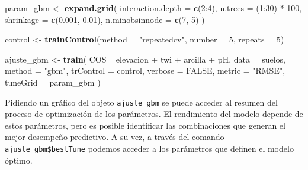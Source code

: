 \documentclass[11pt,b5paper,]{krantz}
\newenvironment{Shaded}{}{}
\newcommand{\CommentTok}[1]{\textcolor[rgb]{0.38,0.63,0.69}{\textit{#1}}}
\newcommand{\DataTypeTok}[1]{\textcolor[rgb]{0.56,0.13,0.00}{#1}}
\newcommand{\DecValTok}[1]{\textcolor[rgb]{0.25,0.63,0.44}{#1}}
\newcommand{\FloatTok}[1]{\textcolor[rgb]{0.25,0.63,0.44}{#1}}
\newcommand{\KeywordTok}[1]{\textcolor[rgb]{0.00,0.44,0.13}{\textbf{#1}}}
\newcommand{\NormalTok}[1]{#1}
\newcommand{\OperatorTok}[1]{\textcolor[rgb]{0.40,0.40,0.40}{#1}}
\newcommand{\OtherTok}[1]{\textcolor[rgb]{0.00,0.44,0.13}{#1}}
\newcommand{\StringTok}[1]{\textcolor[rgb]{0.25,0.44,0.63}{#1}}
\begin{document}
\begin{Shaded}
\begin{Highlighting}[]
\NormalTok{param_gbm <-}\StringTok{  }\KeywordTok{expand.grid}\NormalTok{(}
  \DataTypeTok{interaction.depth =} \KeywordTok{c}\NormalTok{(}\DecValTok{2}\OperatorTok{:}\DecValTok{4}\NormalTok{),}
  \DataTypeTok{n.trees =}\NormalTok{ (}\DecValTok{1}\OperatorTok{:}\DecValTok{30}\NormalTok{) }\OperatorTok{*}\StringTok{ }\DecValTok{100}\NormalTok{,}
  \DataTypeTok{shrinkage =} \KeywordTok{c}\NormalTok{(}\FloatTok{0.001}\NormalTok{, }\FloatTok{0.01}\NormalTok{),}
  \DataTypeTok{n.minobsinnode =} \KeywordTok{c}\NormalTok{(}\DecValTok{7}\NormalTok{, }\DecValTok{5}\NormalTok{)}
\NormalTok{)}

\NormalTok{control <-}\StringTok{ }\KeywordTok{trainControl}\NormalTok{(}\DataTypeTok{method =} \StringTok{"repeatedcv"}\NormalTok{,}
                        \DataTypeTok{number =} \DecValTok{5}\NormalTok{,}
                        \DataTypeTok{repeats =} \DecValTok{5}\NormalTok{)}

\NormalTok{ajuste_gbm <-}\StringTok{ }\KeywordTok{train}\NormalTok{(}
\NormalTok{  COS }\OperatorTok{~}\StringTok{ }\NormalTok{elevacion }\OperatorTok{+}\StringTok{ }\NormalTok{twi }\OperatorTok{+}\StringTok{ }\NormalTok{arcilla }\OperatorTok{+}\StringTok{ }\NormalTok{pH,}
  \DataTypeTok{data =}\NormalTok{ suelos,}
  \DataTypeTok{method =} \StringTok{"gbm"}\NormalTok{,}
  \DataTypeTok{trControl =}\NormalTok{ control,}
  \DataTypeTok{verbose =} \OtherTok{FALSE}\NormalTok{,}
  \DataTypeTok{metric =} \StringTok{"RMSE"}\NormalTok{,}
  \DataTypeTok{tuneGrid =}\NormalTok{ param_gbm}
\NormalTok{)}
\end{Highlighting}
\end{Shaded}

Pidiendo un gráfico del objeto \texttt{ajuste\_gbm} se puede acceder al resumen del proceso de optimización de los parámetros. El rendimiento del modelo depende de estos parámetros, pero es posible identificar las combinaciones que generan el mejor desempeño predictivo. A su vez, a través del comando \texttt{ajuste\_gbm\$bestTune} podemos acceder a los parámetros que definen el modelo óptimo.

\begin{Shaded}
\end{Shaded}
\end{document}
